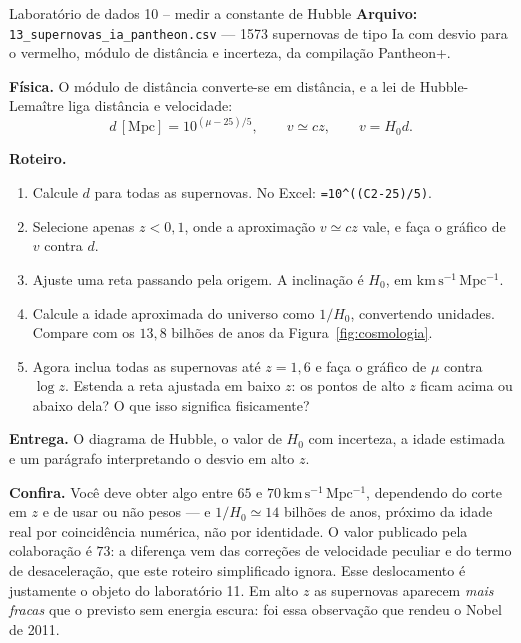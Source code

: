 \documentclass[11pt,a4paper]{article}
\begin{document}
\begin{lessonblock}[borderline west={2pt}{0pt}{astroGold}]{Laboratório de dados 10 -- medir a constante de Hubble}
\textbf{Arquivo:} \texttt{13\_supernovas\_ia\_pantheon.csv} --- 1573 supernovas de tipo Ia com desvio para o vermelho, módulo de distância e incerteza, da compilação Pantheon+.

\textbf{Física.} O módulo de distância converte-se em distância, e a lei de Hubble-Lemaître liga distância e velocidade:
\[
d\,[\mathrm{Mpc}]=10^{(\mu-25)/5},
\qquad
v\simeq cz,
\qquad
v=H_0d.
\]

\textbf{Roteiro.}
\begin{enumerate}
\item Calcule $d$ para todas as supernovas. No Excel: \texttt{=10\^{}((C2-25)/5)}.
\item Selecione apenas $z<0{,}1$, onde a aproximação $v\simeq cz$ vale, e faça o gráfico de $v$ contra $d$.
\item Ajuste uma reta passando pela origem. A inclinação é $H_0$, em $\mathrm{km\,s^{-1}\,Mpc^{-1}}$.
\item Calcule a idade aproximada do universo como $1/H_0$, convertendo unidades. Compare com os $13{,}8$ bilhões de anos da Figura~\ref{fig:cosmologia}.
\item Agora inclua todas as supernovas até $z=1{,}6$ e faça o gráfico de $\mu$ contra $\log z$. Estenda a reta ajustada em baixo $z$: os pontos de alto $z$ ficam acima ou abaixo dela? O que isso significa fisicamente?
\end{enumerate}

\textbf{Entrega.} O diagrama de Hubble, o valor de $H_0$ com incerteza, a idade estimada e um parágrafo interpretando o desvio em alto $z$.

\textbf{Confira.} Você deve obter algo entre $65$ e $70\,\mathrm{km\,s^{-1}\,Mpc^{-1}}$, dependendo do corte em $z$ e de usar ou não pesos --- e $1/H_0\simeq14$ bilhões de anos, próximo da idade real por coincidência numérica, não por identidade. O valor publicado pela colaboração é $73$: a diferença vem das correções de velocidade peculiar e do termo de desaceleração, que este roteiro simplificado ignora. Esse deslocamento é justamente o objeto do laboratório 11. Em alto $z$ as supernovas aparecem \emph{mais fracas} que o previsto sem energia escura: foi essa observação que rendeu o Nobel de 2011.
\end{lessonblock}

\newpage
\end{document}
